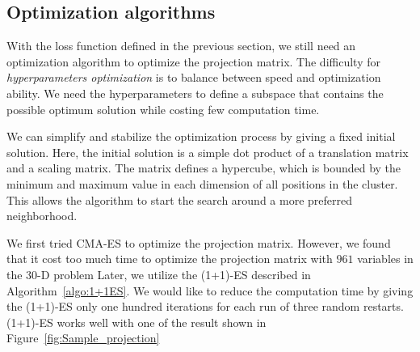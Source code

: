 




\subsection{Optimization algorithms}

With the loss function defined in the previous section, 
we still need an optimization algorithm to optimize the projection matrix.
The difficulty for \textit{hyperparameters optimization} is to balance between speed and optimization ability.
We need the hyperparameters to define a subspace that contains the possible optimum solution while costing few computation time.

We can simplify and stabilize the optimization process by giving a fixed initial solution.
Here, the initial solution is a simple dot product of a translation matrix and a scaling matrix. 
The matrix defines a hypercube, which is bounded by the minimum and maximum value in each dimension of all positions in the cluster.
This allows the algorithm to start the search around a more preferred neighborhood.

We first tried CMA-ES to optimize the projection matrix.
However, we found that it cost too much time to optimize the projection matrix with $961$ variables in the $30$-D problem
Later, we utilize the (1+1)-ES described in Algorithm~\ref{algo:1+1ES}.
We would like to reduce the computation time by giving the (1+1)-ES only one hundred iterations for each run of three random restarts.
(1+1)-ES works well with one of the result shown in Figure~\ref{fig:Sample_projection}

